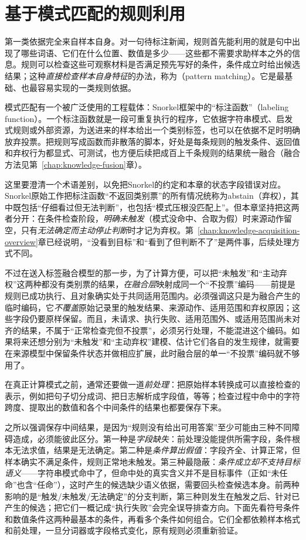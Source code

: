 \Needspace{85mm}
\section{基于模式匹配的规则利用}
\label{sec:rule-based-knowledge-acquisition-pattern}

第一类依据完全来自样本自身。对一句待标注新闻，规则首先能利用的就是句中出现了哪些词语、它们在什么位置、数值是多少——这些都不需要求助样本之外的信息。规则可以检查这些可观察材料是否满足预先写好的条件，条件成立时给出候选结果；这种\emph{直接检查样本自身特征}的办法，称为（pattern matching）。它是最基础、也最容易实现的一类规则依据。

模式匹配有一个被广泛使用的工程载体：Snorkel框架中的“标注函数”（labeling function）。一个标注函数就是一段可重复执行的程序，它依据字符串模式、启发式规则或外部资源，为送进来的样本给出一个类别标签，也可以在依据不足时明确放弃投票。把规则写成函数而非散落的脚本，好处是每条规则的触发条件、返回值和弃权行为都显式、可测试，也方便后续把成百上千条规则的结果统一融合（融合方法见第~\ref{chap:knowledge-fusion}章）。

这里要澄清一个术语差别，以免把Snorkel的约定和本章的状态字段错误对应。Snorkel原始工作把标注函数“不返回类别票”的所有情况统称为abstain（弃权），其中既包括“仔细看过但无法判断”，也包括“模式压根没匹配上”。但本章坚持把这两者分开：在条件检查阶段，\emph{明确未触发}（模式没命中、合取为假）时来源动作留空，只有\emph{无法确定而主动停止判断}时才记为弃权。第~\ref{chap:knowledge-acquisition-overview}章已经说明，“没看到目标”和“看到了但判断不了”是两件事，后续处理方式不同。

不过在送入标签融合模型的那一步，为了计算方便，可以把“未触发”和“主动弃权”这两种都没有类别票的结果，\emph{在融合层}映射成同一个“不投票”编码——前提是规则已成功执行、且对象确实处于共同适用范围内。必须强调这只是为融合产生的临时编码，它\emph{不覆盖}原始记录里的触发结果、来源动作、适用范围和弃权原因；这些字段仍要原样保留。而且，未请求、执行失败、适用范围外、或适用范围尚未对齐的结果，不属于“正常检查完但不投票”，必须另行处理，不能混进这个编码。如果将来还想分别为“未触发”和“主动弃权”建模、估计它们各自的发生规律，就需要在来源模型中保留条件状态并做相应扩展，此时融合层的单一“不投票”编码就不够用了。

在真正计算模式之前，通常还要做一道\emph{前处理}：把原始样本转换成可以直接检查的表示，例如把句子切分成词、把日志解析成字段值，等等；检查过程中命中的字符跨度、提取出的数值和各个中间条件的结果也都要保存下来。

之所以强调保存中间结果，是因为“规则没有给出可用答案”至少可能由三种不同障碍造成，必须能彼此区分。第一种是\emph{字段缺失}：前处理没能提供所需字段，条件根本无法求值，结果是无法确定。第二种是\emph{条件算出假值}：字段齐全、计算正常，但样本确实不满足条件，规则正常地未触发。第三种最隐蔽：\emph{条件成立却不支持目标语义}——字符串模式命中了，但命中处的真实含义并不是目标事件（正如“未任命”也含“任命”），这时产生的候选缺少语义依据，需要回头检查候选本身。前两种影响的是“触发/未触发/无法确定”的分支判断，第三种则发生在触发之后、针对已产生的候选；把它们一概记成“执行失败”会完全误导排查方向。下面先看符号条件和数值条件这两种最基本的条件，再看多个条件如何组合。它们全都依赖样本格式和前处理，一旦分词器或字段格式变化，原有规则必须重新验证。

